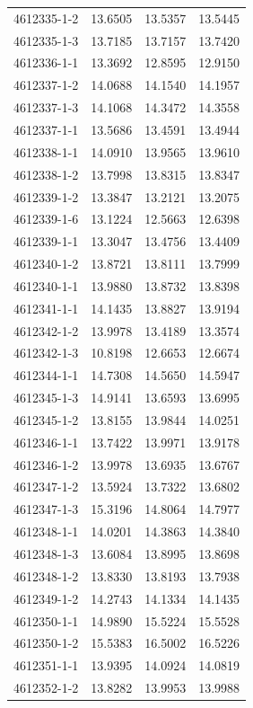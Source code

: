 \begin{longtable}{lrrr}
4612335-1-2 & 13.6505 & 13.5357 & 13.5445 \\
4612335-1-3 & 13.7185 & 13.7157 & 13.7420 \\
4612336-1-1 & 13.3692 & 12.8595 & 12.9150 \\
4612337-1-2 & 14.0688 & 14.1540 & 14.1957 \\
4612337-1-3 & 14.1068 & 14.3472 & 14.3558 \\
4612337-1-1 & 13.5686 & 13.4591 & 13.4944 \\
4612338-1-1 & 14.0910 & 13.9565 & 13.9610 \\
4612338-1-2 & 13.7998 & 13.8315 & 13.8347 \\
4612339-1-2 & 13.3847 & 13.2121 & 13.2075 \\
4612339-1-6 & 13.1224 & 12.5663 & 12.6398 \\
4612339-1-1 & 13.3047 & 13.4756 & 13.4409 \\
4612340-1-2 & 13.8721 & 13.8111 & 13.7999 \\
4612340-1-1 & 13.9880 & 13.8732 & 13.8398 \\
4612341-1-1 & 14.1435 & 13.8827 & 13.9194 \\
4612342-1-2 & 13.9978 & 13.4189 & 13.3574 \\
4612342-1-3 & 10.8198 & 12.6653 & 12.6674 \\
4612344-1-1 & 14.7308 & 14.5650 & 14.5947 \\
4612345-1-3 & 14.9141 & 13.6593 & 13.6995 \\
4612345-1-2 & 13.8155 & 13.9844 & 14.0251 \\
4612346-1-1 & 13.7422 & 13.9971 & 13.9178 \\
4612346-1-2 & 13.9978 & 13.6935 & 13.6767 \\
4612347-1-2 & 13.5924 & 13.7322 & 13.6802 \\
4612347-1-3 & 15.3196 & 14.8064 & 14.7977 \\
4612348-1-1 & 14.0201 & 14.3863 & 14.3840 \\
4612348-1-3 & 13.6084 & 13.8995 & 13.8698 \\
4612348-1-2 & 13.8330 & 13.8193 & 13.7938 \\
4612349-1-2 & 14.2743 & 14.1334 & 14.1435 \\
4612350-1-1 & 14.9890 & 15.5224 & 15.5528 \\
4612350-1-2 & 15.5383 & 16.5002 & 16.5226 \\
4612351-1-1 & 13.9395 & 14.0924 & 14.0819 \\
4612352-1-2 & 13.8282 & 13.9953 & 13.9988 \\

\end{longtable}
